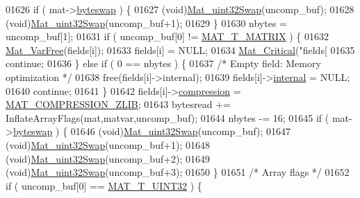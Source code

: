 \begin{DoxyCode}
{{{{{{{{{{{{01626             \textcolor{keywordflow}{if} ( mat->\hyperlink{struct__mat__t_a99d207977af5e04941ace56d71817a40}{byteswap} ) \{
01627                 (void)\hyperlink{endian_8c_a8cb0d0750e2eaf9840d95db531934f4f}{Mat\_uint32Swap}(uncomp\_buf);
01628                 (void)\hyperlink{endian_8c_a8cb0d0750e2eaf9840d95db531934f4f}{Mat\_uint32Swap}(uncomp\_buf+1);
01629             \}
01630             nbytes = uncomp\_buf[1];
01631             \textcolor{keywordflow}{if} ( uncomp\_buf[0] != \hyperlink{group___m_a_t_ggacf7b3b879282b7ab3a51190e49bf3453a32985fee89a4df8db4b3f5d3a48823d3}{MAT\_T\_MATRIX} ) \{
01632                 \hyperlink{group___m_a_t_ga1d14716f7450530fd1c9d02413787f0e}{Mat\_VarFree}(fields[i]);
01633                 fields[i] = NULL;
01634                 \hyperlink{group__mat__util_gaf51f2bfbb5580f575e4dd79757e2b80c}{Mat\_Critical}(\textcolor{stringliteral}{"fields[%
01635                 \textcolor{keywordflow}{continue};
01636             \} \textcolor{keywordflow}{else} \textcolor{keywordflow}{if} ( 0 == nbytes ) \{
01637                 \textcolor{comment}{/* Empty field: Memory optimization */}
01638                 free(fields[i]->\textcolor{keyword}{internal});
01639                 fields[i]->\hyperlink{group___m_a_t_a6e97e3ed9f40c49322c18561c2a94e92}{internal} = NULL;
01640                 \textcolor{keywordflow}{continue};
01641             \}
01642             fields[i]->\hyperlink{group___m_a_t_aeef0466048621cb2c959ba7f6c774d06}{compression} = \hyperlink{group___m_a_t_gga768c318af97bd2567758ecb001ceb7f4a5181d2f71eab0f12f05ba65d4f13fb53}{MAT\_COMPRESSION\_ZLIB};
01643             bytesread += InflateArrayFlags(mat,matvar,uncomp\_buf);
01644             nbytes -= 16;
01645             \textcolor{keywordflow}{if} ( mat->\hyperlink{struct__mat__t_a99d207977af5e04941ace56d71817a40}{byteswap} ) \{
01646                 (void)\hyperlink{endian_8c_a8cb0d0750e2eaf9840d95db531934f4f}{Mat\_uint32Swap}(uncomp\_buf);
01647                 (void)\hyperlink{endian_8c_a8cb0d0750e2eaf9840d95db531934f4f}{Mat\_uint32Swap}(uncomp\_buf+1);
01648                 (void)\hyperlink{endian_8c_a8cb0d0750e2eaf9840d95db531934f4f}{Mat\_uint32Swap}(uncomp\_buf+2);
01649                 (void)\hyperlink{endian_8c_a8cb0d0750e2eaf9840d95db531934f4f}{Mat\_uint32Swap}(uncomp\_buf+3);
01650             \}
01651             \textcolor{comment}{/* Array flags */}
01652             \textcolor{keywordflow}{if} ( uncomp\_buf[0] == \hyperlink{group___m_a_t_ggacf7b3b879282b7ab3a51190e49bf3453aa397e285a23fe240368b752897652c6a}{MAT\_T\_UINT32} ) \{
}}}}}}}}}}}}}
\end{DoxyCode}
